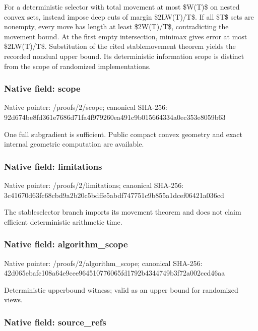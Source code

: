 \documentclass[10pt,a4paper]{article}
\begin{document}
For a deterministic selector with total movement at most \$W(T)\$ on nested convex sets, instead impose deep cuts of margin \$2LW(T)/T\$. If all \$T\$ sets are nonempty, every move has length at least \$2W(T)/T\$, contradicting the movement bound. At the first empty intersection, minimax gives error at most \$2LW(T)/T\$. Substitution of the cited stablemovement theorem yields the recorded nondual upper bound. Its deterministic information scope is distinct from the scope of randomized implementations.


\subsubsection{Native field: scope}


Native pointer: /proofs/2/scope; canonical SHA-256: 92d674be8fd361e7686d71fa\allowbreak{}4f979260ea491c9b01566433\allowbreak{}4a0ec353e8059b63


One full subgradient is sufficient. Public compact convex geometry and exact internal geometric computation are available.


\subsubsection{Native field: limitations}


Native pointer: /proofs/2/limitations; canonical SHA-256: 3c41670d63fc68cbd9a2b20c\allowbreak{}5bdffe5abdf747751c9b855a\allowbreak{}1dcef06421a036cd


The stableselector branch imports its movement theorem and does not claim efficient deterministic arithmetic time.


\subsubsection{Native field: algorithm\_scope}


Native pointer: /proofs/2/algorithm\_scope; canonical SHA-256: 42d065ebafc108a64e9cee96\allowbreak{}4510776065fd1792b4344749\allowbreak{}b3f72a002ccd46aa


Deterministic upperbound witness; valid as an upper bound for randomized views.


\subsubsection{Native field: source\_refs}
\end{document}
